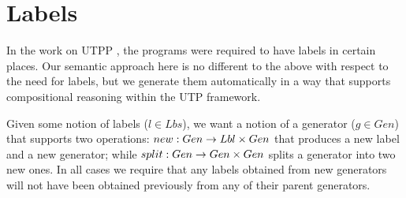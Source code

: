 \section{Labels}\label{sec:labels}

In the work on UTPP \cite{DBLP:conf/icfem/WoodcockH02},
the programs were required to have labels in certain places.
Our semantic approach here is no different to the above with respect to
the need for labels,
but we generate them automatically
in a way that supports compositional reasoning within the UTP framework.

Given some notion of labels ($l \in Lbs$),
we want a notion of a generator ($g \in Gen$) that supports two operations:
$new:Gen \rightarrow Lbl \times Gen$ that produces a new label and a new generator;
while
$split:Gen \rightarrow Gen \times Gen$ splits a generator into two new ones.
In all cases we require that any labels obtained from new generators
will not have been obtained previously from any of their parent generators.

